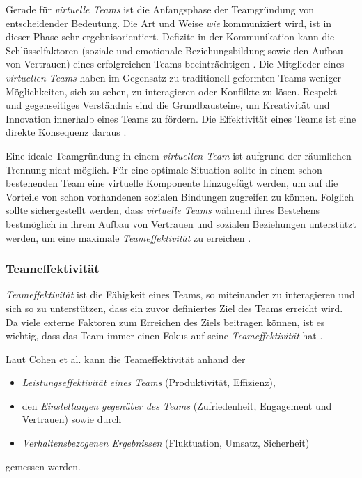 \documentclass[a4paper,11pt]{article}%
\renewcommand{\\}{\vspace*{0.5\baselineskip} \newline}
\begin{document}
Gerade für \textit{virtuelle Teams} ist die Anfangsphase der Teamgründung von entscheidender Bedeutung. 
Die Art und Weise \textit{wie} kommuniziert wird, ist in dieser Phase sehr ergebnisorientiert. Defizite in der Kommunikation kann die Schlüsselfaktoren (soziale und emotionale Beziehungsbildung sowie den Aufbau von Vertrauen) eines erfolgreichen Teams beeinträchtigen \citep[S. 378]{ren2007applying}.
Die Mitglieder eines \textit{virtuellen Teams} haben im Gegensatz zu traditionell geformten Teams weniger Möglichkeiten, sich zu sehen, zu interagieren oder Konflikte zu lösen. 
Respekt und gegenseitiges Verständnis sind die Grundbausteine, um Kreativität und Innovation innerhalb eines Teams zu fördern. Die Effektivität eines Teams ist eine direkte Konsequenz daraus \citep[S. 378]{ren2007applying}.

Eine ideale Teamgründung in einem \textit{virtuellen Team} ist aufgrund der räumlichen Trennung nicht möglich. 
Für eine optimale Situation sollte in einem schon bestehenden Team eine virtuelle Komponente hinzugefügt werden, um auf die Vorteile von schon vorhandenen sozialen Bindungen zugreifen zu können. Folglich sollte sichergestellt werden, dass \textit{virtuelle Teams} während ihres Bestehens bestmöglich in ihrem Aufbau von Vertrauen und sozialen Beziehungen unterstützt werden, um eine maximale \textit{Teameffektivität} zu erreichen \citep[S. 36-37]{holton2001building}.

\subsubsection{Teameffektivität}
\label{Teameffektivität}
\textit{Teameffektivität} ist die Fähigkeit eines Teams, so miteinander zu interagieren und sich so zu unterstützen, dass ein zuvor definiertes Ziel des Teams erreicht wird. Da viele externe Faktoren zum Erreichen des Ziels beitragen können, ist es wichtig, dass das Team immer einen Fokus auf seine \textit{Teameffektivität} hat \citep[S. 557]{salas2005there}.

Laut Cohen et al. \citep[243-245]{cohen1997makes} kann die Teameffektivität anhand der 
\begin{itemize}
\item \textit{Leistungseffektivität eines Teams} (Produktivität, Effizienz), 
\item den \textit{Einstellungen gegenüber des Teams} (Zufriedenheit, Engagement und Vertrauen) sowie durch 
\item \textit{Verhaltensbezogenen Ergebnissen} (Fluktuation, Umsatz, Sicherheit) 
\end{itemize}
gemessen werden. 
\end{document}
